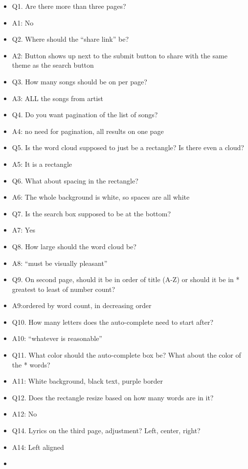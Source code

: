 \documentclass[]{article}
\begin{document}
\begin{itemize}
\itemsep1pt\parskip0pt
\item
  Q1. Are there more than three pages?
\item
  A1: No
\item
  Q2. Where should the ``share link'' be?
\item
  A2: Button shows up next to the submit button to share with the same
  theme as the search button
\item
  Q3. How many songs should be on per page?
\item
  A3: ALL the songs from artist
\item
  Q4. Do you want pagination of the list of songs?
\item
  A4: no need for pagination, all results on one page
\item
  Q5. Is the word cloud supposed to just be a rectangle? Is there even a
  cloud?
\item
  A5: It is a rectangle
\item
  Q6. What about spacing in the rectangle?
\item
  A6: The whole background is white, so spaces are all white
\item
  Q7. Is the search box supposed to be at the bottom?
\item
  A7: Yes
\item
  Q8. How large should the word cloud be?
\item
  A8: ``must be visually pleasant''
\item
  Q9. On second page, should it be in order of title (A-Z) or should it
  be in * greatest to least of number count?
\item
  A9:ordered by word count, in decreasing order
\item
  Q10. How many letters does the auto-complete need to start after?
\item
  A10: ``whatever is reasonable''
\item
  Q11. What color should the auto-complete box be? What about the color
  of the * words?
\item
  A11: White background, black text, purple border
\item
  Q12. Does the rectangle resize based on how many words are in it?
\item
  A12: No
\item
  Q14. Lyrics on the third page, adjustment? Left, center, right?
\item
  A14: Left aligned
\item

\end{itemize}
\end{document}
